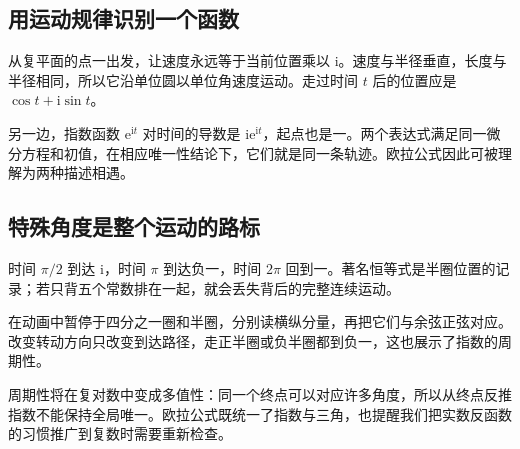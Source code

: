 \subsection*{用运动规律识别一个函数}
从复平面的点一出发，让速度永远等于当前位置乘以 $\mathrm i$。速度与半径垂直，长度与半径相同，所以它沿单位圆以单位角速度运动。走过时间 $t$ 后的位置应是 $\cos t+\mathrm i\sin t$。

另一边，指数函数 $\mathrm e^{\mathrm it}$ 对时间的导数是 $\mathrm i\mathrm e^{\mathrm it}$，起点也是一。两个表达式满足同一微分方程和初值，在相应唯一性结论下，它们就是同一条轨迹。欧拉公式因此可被理解为两种描述相遇。

\subsection*{特殊角度是整个运动的路标}
时间 $\pi/2$ 到达 $\mathrm i$，时间 $\pi$ 到达负一，时间 $2\pi$ 回到一。著名恒等式是半圈位置的记录；若只背五个常数排在一起，就会丢失背后的完整连续运动。

在动画中暂停于四分之一圈和半圈，分别读横纵分量，再把它们与余弦正弦对应。改变转动方向只改变到达路径，走正半圈或负半圈都到负一，这也展示了指数的周期性。

周期性将在复对数中变成多值性：同一个终点可以对应许多角度，所以从终点反推指数不能保持全局唯一。欧拉公式既统一了指数与三角，也提醒我们把实数反函数的习惯推广到复数时需要重新检查。
